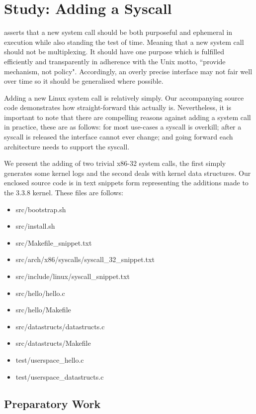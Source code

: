 \documentclass{article}
\begin{document}
\section{Study: Adding a Syscall}

\citet{Love7} asserts that a new system call should be both purposeful and ephemeral in execution while also standing the test of time. 
Meaning that a new system call should not be multiplexing. It should have one purpose which is fulfilled efficiently and transparently 
in adherence with the Unix motto, ``provide mechanism, not policy". Accordingly, 
an overly precise interface may not fair well over time so it should be generalised where possible. 
\par
Adding a new Linux system call is relatively simply. Our accompanying source code demonstrates
how straight-forward this actually is. Nevertheless, it is important to note
that there are compelling reasons against adding 
a system call in practice, these are as follows: for most use-cases a syscall is overkill; 
after a syscall is released the interface cannot ever change;
and going forward each architecture needs to support the syscall.
\par 
We present the adding of two trivial x86-32 system calls, the first simply generates some
kernel logs and the second deals with kernel data structures. Our enclosed 
source code is in text snippets form representing the additions made to
the 3.3.8 kernel. These files are follows:
\begin{itemize}
  \item src/bootstrap.sh
  \item src/install.sh
  \item src/Makefile\_snippet.txt
  \item src/arch/x86/syscalls/syscall\_32\_snippet.txt
  \item src/include/linux/syscall\_snippet.txt
  \item src/hello/hello.c
  \item src/hello/Makefile
  \item src/datastructs/datastructs.c
  \item src/datastructs/Makefile
  \item test/userspace\_hello.c
  \item test/userspace\_datastructs.c
\end{itemize}

\subsection{Preparatory Work}
\end{document}
